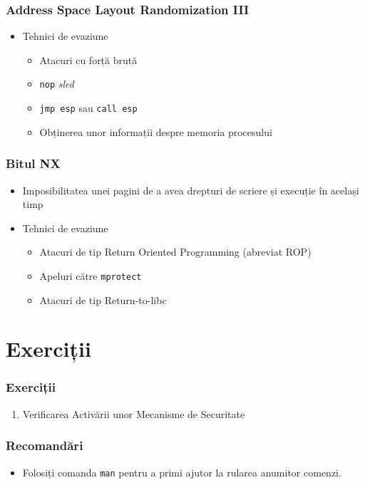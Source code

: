 \documentclass[xcolor={table}]{beamer}
\begin{document}
    \begin{frame}
		\frametitle{Address Space Layout Randomization III}\pause
		\begin{itemize}[<+->]
		    \item Tehnici de evaziune
		        \begin{itemize}
			        \item Atacuri cu forță brută
			        \item \texttt{nop} \textit{sled}
			        \item \texttt{jmp esp} sau \texttt{call esp}
			        \item Obținerea unor informații despre memoria procesului
			    \end{itemize}
        \end{itemize}
    \end{frame}
    
    \begin{frame}
		\frametitle{Bitul NX}\pause
		\begin{itemize}[<+->]
		    \item Imposibilitatea unei pagini de a avea drepturi de scriere și execuție în același timp
		    \item Tehnici de evaziune
		        \begin{itemize}
			        \item Atacuri de tip Return Oriented Programming (abreviat ROP)
			        \item Apeluri către \texttt{mprotect}
			        \item Atacuri de tip Return-to-libc
			    \end{itemize}
        \end{itemize}
    \end{frame}

	\section{Exerciții}
	
	\begin{frame}
		\frametitle{Exerciții}\pause
		\begin{enumerate}[<+->]
		    \item Verificarea Activării unor Mecanisme de Securitate
	    \end{enumerate}
	\end{frame}

	\begin{frame}
		\frametitle{Recomandări}\pause
		\begin{itemize}[<+->]
		    \item Folosiți comanda \texttt{man} pentru a primi ajutor la rularea anumitor comenzi.
	    \end{itemize}
	\end{frame}
\end{document}

